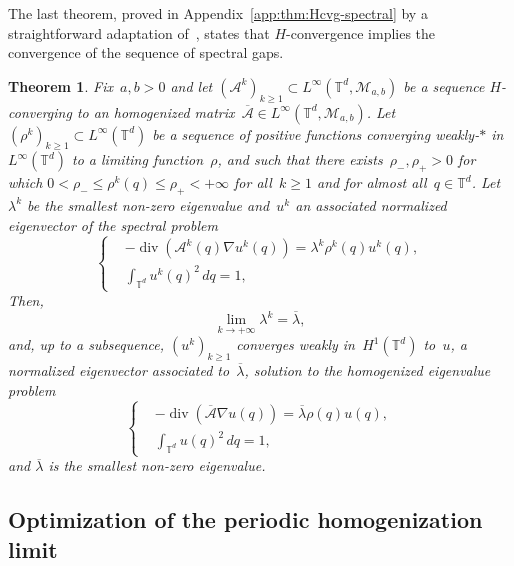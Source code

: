 \documentclass{article}
\newtheorem{theorem}{Theorem}
\renewcommand{\leq}{\leqslant}
\renewcommand{\geq}{\geqslant}
\def\T{\mathbb{T}}
\newcommand{\A}{\mathcal{A}}
\renewcommand{\dim}{d}
\begin{document}
The last theorem, proved in Appendix~\ref{app:thm:Hcvg-spectral} by a straightforward adaptation of~\cite[Theorem~1.3.16]{allaire_homogeneisation}, states that $H$-convergence implies the convergence of the sequence of spectral gaps.

\begin{theorem}
\label{thm:Hcvg-spectral}
Fix~$a,b>0$ and let $(\A^k)_{k\geq 1}\subset L^{\infty}(\T^\dim,\mathcal{M}_{a,b})$ be a sequence $H$-converging to an homogenized matrix~$\overline{\mathcal{A}} \in L^{\infty}(\T^\dim,\mathcal{M}_{a,b})$. Let $(\rho^k)_{k\geq 1} \subset L^{\infty}(\T^\dim)$ be a sequence of positive functions converging weakly-$*$ in~$L^{\infty}(\T^\dim)$ to a limiting function~$\rho$, and such that there exists~$\rho_-,\rho_+>0$ for which $0<\rho_{-}\leq \rho^k(q)\leq \rho_+<+\infty$ for all~$k\geq 1$ and for almost all~$q\in\T^\dim$. Let~$\lambda^k$ be the smallest non-zero eigenvalue and~$u^k$ an associated normalized eigenvector of the spectral problem
\begin{equation}
\label{eq:spectral-homog}
\left\{\begin{aligned}
& -\operatorname{div}\left(\A^k(q)\nabla u^k(q)\right) = \lambda^k\rho^k(q)u^k(q),\\
& \int_{\T^\dim} u^k(q)^2 \, dq = 1,
\end{aligned}\right.
\end{equation}
Then, 
\begin{equation}
\label{eq:cvg-spectral}
\lim_{k\rightarrow +\infty}\lambda^k = \overline{\lambda},
\end{equation}
and, up to a subsequence, $(u^k)_{k\geq 1}$ converges weakly in~$H^1(\T^\dim)$ to~$u$, a normalized eigenvector associated to~$\overline{\lambda}$, solution to the homogenized eigenvalue problem
\begin{equation}
  \label{eq:spectral-homog-lim}
  \left\{\begin{aligned}
  & -\operatorname{div}\left(\overline{\mathcal{A}}\nabla u(q)\right) = \overline{\lambda}\rho(q)u(q),\\
  & \int_{\T^\dim} u(q)^2 \, dq = 1,
\end{aligned}\right.
\end{equation}
and $\overline{\lambda}$ is the smallest non-zero eigenvalue.
\end{theorem}

\subsection{Optimization of the periodic homogenization limit}
\label{subsec:per-homog}
\end{document}
